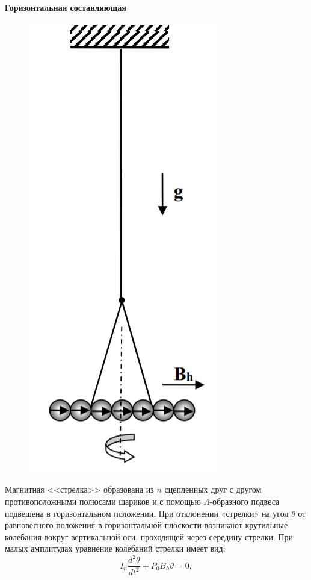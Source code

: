 \paragraph*{Горизонтальная составляющая}
\begin{figure}
\includegraphics[scale=0.5]{1.png}
\vspace{-40pt}
\end{figure}\n
Магнитная <<стрелка>> образована из $n$ сцепленных друг с другом противоположными полюсами шариков и с помощью $\Lambda$-образного подвеса подвешена в горизонтальном положении. При отклонении «стрелки» на угол $\theta$ от равновесного положения в горизонтальной плоскости возникают крутильные колебания вокруг вертикальной оси, проходящей через середину стрелки. При малых амплитудах уравнение колебаний
стрелки имеет вид:
$$
I_n \dfrac{d^2 \theta}{dt^2} + P_0 B_h \theta = 0,
$$ 
